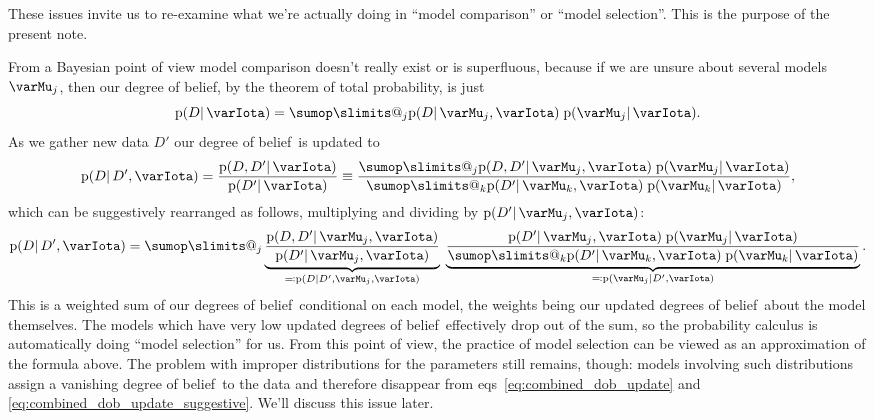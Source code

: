 \documentclass[\ifafour a4paper,12pt,\else a5paper,10pt,\fi%
onecolumn,oneside,article,%
british%
]{memoir}
\makeatletter
\theoremstyle{remark}
\theoremstyle{innote}
\def\sum{\DOTSI\sumop\slimits@}
\newcommand*{\defs}{\eqqcolon}
\newcommand*{\pf}{\mathrm{p}}%
\renewcommand*{\|}{\mathpunct{|}}
\newcommand*{\eqns}{eqs}%
\newcommand*{\dob}{degree of belief}
\newcommand*{\dobs}{degrees of belief}
\newcommand*{\yM}{\varMu}
\newcommand*{\yI}{\varIota}
\newcommand*{\yD}{D}
\newcommand*{\yHm}{\yM}
\makeatother
\begin{document}
These issues invite us to re-examine what we're actually doing in
\enquote{model comparison} or \enquote{model selection}. This is the
purpose of the present note.


\bigskip

From a Bayesian point of view model comparison doesn't really exist or is
superfluous, because if we are unsure about several models $\yHm_j$, then
our \dob, by the theorem of total probability, is just
\begin{equation}
  \label{eq:combined_dob}
  \pf(\yD \| \yI) =
  \sum_j \pf(\yD \| \yHm_j,\yI)\; \pf(\yHm_j \| \yI).
\end{equation}
As we gather new data $\yD'$ our \dob\ is updated to
\begin{equation}
  \label{eq:combined_dob_update}
  \pf(\yD \|\yD', \yI) =
  \frac{\pf(\yD, \yD'\| \yI)}{\pf(\yD' \| \yI)} \equiv
  \frac{\sum_j \pf(\yD, \yD' \| \yHm_j,\yI)\; \pf(\yHm_j \| \yI)}{
    \sum_k \pf(\yD' \| \yHm_k,\yI)\; \pf(\yHm_k \| \yI)},
\end{equation}
which can be suggestively rearranged as follows, multiplying and
dividing by $\pf(\yD' \| \yHm_j, \yI)$:
\begin{equation}
  \label{eq:combined_dob_update_suggestive}
  \pf(\yD \|\yD', \yI) =
  \sum_j
  \underbrace{\frac{\pf(\yD, \yD' \| \yHm_j,\yI)}{\pf(\yD' \| \yHm_j,\yI)}}_{{}\defs\pf(\yD \| \yD', \yHm_j,\yI)}\;
  \underbrace{\frac{
  \pf(\yD' \| \yHm_j, \yI)\; \pf(\yHm_j \| \yI)
  }{
  \sum_k \pf(\yD' \| \yHm_k, \yI)\; \pf(\yHm_k \| \yI)
  }}_{{}\defs\pf(\yHm_j \| \yD', \yI)}.
\end{equation}
This is a weighted sum of our \dobs\ conditional on each model, the weights
being our updated \dobs\ about the model themselves. The models which have
very low updated \dobs\ effectively drop out of the sum, so the probability
calculus is automatically doing \enquote{model selection} for us. From this
point of view, the practice of model selection can be viewed as an
approximation of the formula above. The problem with improper distributions
for the parameters still remains, though: models involving such
distributions assign a vanishing \dob\ to the data and therefore disappear
from \eqns~\eqref{eq:combined_dob_update} and
\eqref{eq:combined_dob_update_suggestive}. We'll discuss this issue later.
\end{document}
